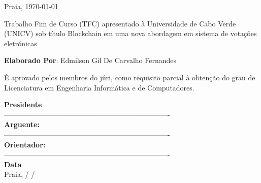 \documentclass[a4paper,12pt]{report}
\begin{document}
\begin{center}
    Praia, \today
    
    \vspace{1cm}
    Trabalho Fim de Curso (TFC) apresentado à Universidade de Cabo Verde (UNICV) sob título Blockchain em uma nova abordagem em sistema de votações eletrónicas
    
    \vspace{1.5cm}
    \textbf{Elaborado Por}: Edmilson Gil De Carvalho Fernandes
    
    \vspace{1.5cm}
    É aprovado pelos membros do júri, como requisito parcial à obtenção do grau de Licenciatura em Engenharia Informática e de Computadores.
    
    \vspace{1.5cm}
    \textbf{Presidente}\\
    \vspace{1.5cm}
    ----------------------------------------------------------------------\\
    \vspace{1.5cm}
    \textbf{Arguente:}\\
    \vspace{1.5cm}
    ----------------------------------------------------------------------\\
    \vspace{1.5cm}
    \textbf{Orientador:}\\
    \vspace{1.5cm}
    ----------------------------------------------------------------------\\
    \vspace{1cm}
    \textbf{Data}\\
    \vspace{1cm}
    Praia, \textunderscore\textunderscore\textunderscore\textunderscore\textunderscore/
            \textunderscore\textunderscore\textunderscore\textunderscore\textunderscore/
            \textunderscore\textunderscore\textunderscore\textunderscore\textunderscore
\end{center}

\newpage
\hypersetup{pageanchor=true}





\newpage


\end{document}
